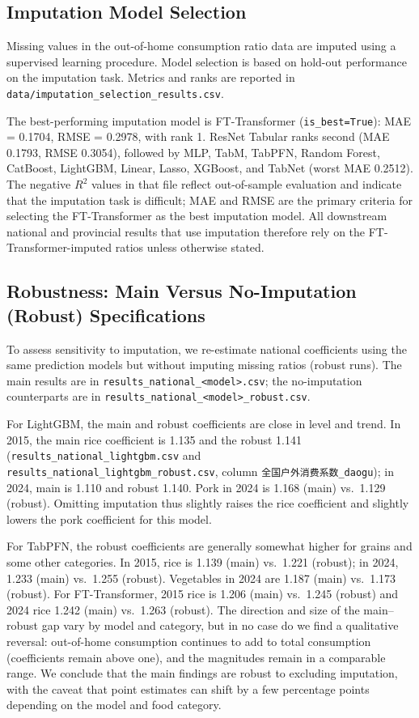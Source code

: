 \subsection{Imputation Model Selection}

Missing values in the out-of-home consumption ratio data are imputed using a supervised learning procedure. Model selection is based on hold-out performance on the imputation task. Metrics and ranks are reported in \texttt{data/imputation\_selection\_results.csv}.

The best-performing imputation model is FT-Transformer (\texttt{is\_best=True}): MAE = 0.1704, RMSE = 0.2978, with rank 1. ResNet Tabular ranks second (MAE 0.1793, RMSE 0.3054), followed by MLP, TabM, TabPFN, Random Forest, CatBoost, LightGBM, Linear, Lasso, XGBoost, and TabNet (worst MAE 0.2512). The negative $R^2$ values in that file reflect out-of-sample evaluation and indicate that the imputation task is difficult; MAE and RMSE are the primary criteria for selecting the FT-Transformer as the best imputation model. All downstream national and provincial results that use imputation therefore rely on the FT-Transformer-imputed ratios unless otherwise stated.

\subsection{Robustness: Main Versus No-Imputation (Robust) Specifications}

To assess sensitivity to imputation, we re-estimate national coefficients using the same prediction models but without imputing missing ratios (robust runs). The main results are in \texttt{results\_national\_<model>.csv}; the no-imputation counterparts are in \texttt{results\_national\_<model>\_robust.csv}.

For LightGBM, the main and robust coefficients are close in level and trend. In 2015, the main rice coefficient is 1.135 and the robust 1.141 (\texttt{results\_national\_lightgbm.csv} and \texttt{results\_national\_lightgbm\_robust.csv}, column \texttt{全国户外消费系数\_daogu}); in 2024, main is 1.110 and robust 1.140. Pork in 2024 is 1.168 (main) vs.\ 1.129 (robust). Omitting imputation thus slightly raises the rice coefficient and slightly lowers the pork coefficient for this model.

For TabPFN, the robust coefficients are generally somewhat higher for grains and some other categories. In 2015, rice is 1.139 (main) vs.\ 1.221 (robust); in 2024, 1.233 (main) vs.\ 1.255 (robust). Vegetables in 2024 are 1.187 (main) vs.\ 1.173 (robust). For FT-Transformer, 2015 rice is 1.206 (main) vs.\ 1.245 (robust) and 2024 rice 1.242 (main) vs.\ 1.263 (robust). The direction and size of the main--robust gap vary by model and category, but in no case do we find a qualitative reversal: out-of-home consumption continues to add to total consumption (coefficients remain above one), and the magnitudes remain in a comparable range. We conclude that the main findings are robust to excluding imputation, with the caveat that point estimates can shift by a few percentage points depending on the model and food category.

